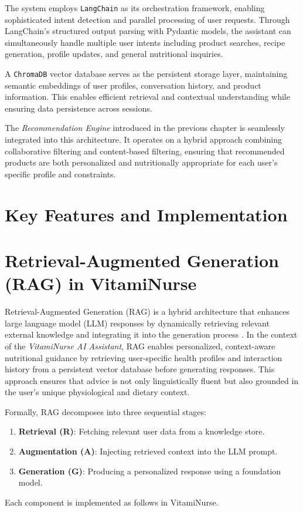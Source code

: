 The system employs \texttt{LangChain} as its orchestration framework, enabling sophisticated intent detection and parallel processing of user requests. Through LangChain's structured output parsing with Pydantic models, the assistant can simultaneously handle multiple user intents including product searches, recipe generation, profile updates, and general nutritional inquiries.

A \texttt{ChromaDB} vector database serves as the persistent storage layer, maintaining semantic embeddings of user profiles, conversation history, and product information. This enables efficient retrieval and contextual understanding while ensuring data persistence across sessions.

The \emph{Recommendation Engine} introduced in the previous chapter is seamlessly integrated into this architecture. It operates on a hybrid approach combining collaborative filtering and content-based filtering, ensuring that recommended products are both personalized and nutritionally appropriate for each user's specific profile and constraints.

\section{Key Features and Implementation}


\section{Retrieval-Augmented Generation (RAG) in VitamiNurse}
\label{sec:rag}

Retrieval-Augmented Generation (RAG) is a hybrid architecture that enhances large language model (LLM) responses by dynamically retrieving relevant external knowledge and integrating it into the generation process \cite{lewis2020retrieval}. In the context of the \textit{VitamiNurse AI Assistant}, RAG enables personalized, context-aware nutritional guidance by retrieving user-specific health profiles and interaction history from a persistent vector database before generating responses. This approach ensures that advice is not only linguistically fluent but also grounded in the user’s unique physiological and dietary context.

Formally, RAG decomposes into three sequential stages:
\begin{enumerate}
    \item \textbf{Retrieval (R)}: Fetching relevant user data from a knowledge store.
    \item \textbf{Augmentation (A)}: Injecting retrieved context into the LLM prompt.
    \item \textbf{Generation (G)}: Producing a personalized response using a foundation model.
\end{enumerate}
Each component is implemented as follows in VitamiNurse.

